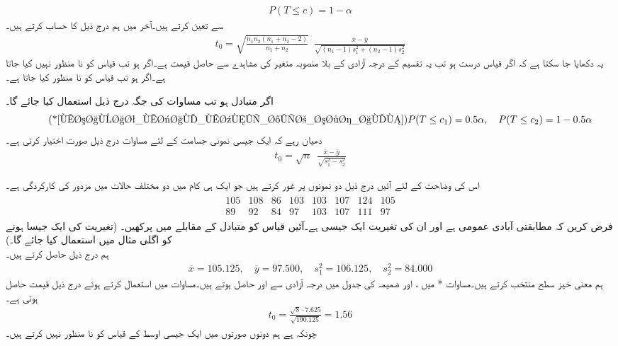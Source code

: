 \begin{align}\label{مساوات_مثال_معنی_خیز_سطح_الف}
P(T\le c)=1-\alpha
\end{align}
سے تعین کرتے ہیں۔آخر میں ہم درج ذیل کا حساب کرتے ہیں۔
\begin{align}\label{مساوات_مثال_معنی_خیز_سطح_ب}
t_0=\sqrt{\frac{n_1n_2(n_1+n_2-2)}{n_1+n_2}}\,\,\, \frac{\overline{x}-\overline{y}}{\sqrt{(n_1-1)s_1^2+(n_2-1)s_2^2}}
\end{align}
یہ دکھایا جا سکتا ہے کہ اگر قیاس درست ہو تب یہ   تقسیم کے   درجہ آزادی کے  بلا منصوبہ متغیر کی مشاہدے سے حاصل قیمت ہے۔اگر  ہو تب قیاس کو نا منظور نہیں کیا جاتا ہے۔اگر ہو تب قیاس کو نا منظور کیا جاتا ہے۔

اگر متبادل  ہو تب مساوات  کی جگہ درج ذیل استعمال کیا جائے گا۔
\begin{align*}\tag*{(*\ref{مساوات_مثال_معنی_خیز_سطح_الف})}
P(T\le c_1)=0.5\alpha,\quad P(T\le c_2)=1-0.5\alpha
\end{align*}
دھیان رہے کہ ایک جیسی نمونی جسامت  کے لئے  مساوات  درج ذیل صورت اختیار کرتی ہے۔
\begin{align}\label{مساوات_مثال_معنی_خیز_سطح_پ}
t_0=\sqrt{n}\,\,\,\frac{\overline{x}-\overline{y}}{\sqrt{s_1^2-s_2^2}}
\end{align}

اس کی وضاحت کے لئے آئیں درج ذیل دو نمونوں پر غور کرتے ہیں جو ایک ہی کام میں دو مختلف حالات میں مزدور کی کارکردگی ہے۔
\begin{align*}
\begin{array}{rrrrrrrr}
105&108&86&103&103&107&124&105\\
89&92&84&97&103&107&111&97
\end{array}
\end{align*}
فرض کریں کہ مطابقتی آبادی عمومی ہے اور ان کی تغیریت ایک جیسی ہے۔آئیں قیاس  کو متبادل  کے مقابلے میں پرکھیں۔ (تغیریت کی ایک جیسا ہونے کو اگلی مثال میں استعمال کیا جائے گا۔)\\
\quad
ہم درج ذیل حاصل کرتے ہیں۔
\begin{align*}
\overline{x}=105.125,\quad \overline{y}=97.500,\quad s_1^2=106.125,\quad s_2^2=84.000
\end{align*}
ہم معنی خیز سطح  منتخب کرتے ہیں۔مساوات * میں ،  اور  ضمیمہ  کی جدول  میں  درجہ آزادی سے  اور  حاصل ہوتے ہیں۔مساوات  میں  استعمال کرتے ہوئے درج ذیل قیمت حاصل ہوتی ہے۔
\begin{align*}
t_0=\frac{\sqrt{8}\cdot 7.625}{\sqrt{190.125}}=1.56
\end{align*}
چونکہ  ہے ہم دونوں صورتوں میں ایک جیسی اوسط کے  قیاس  کو نا منظور نہیں کرتے ہیں۔

